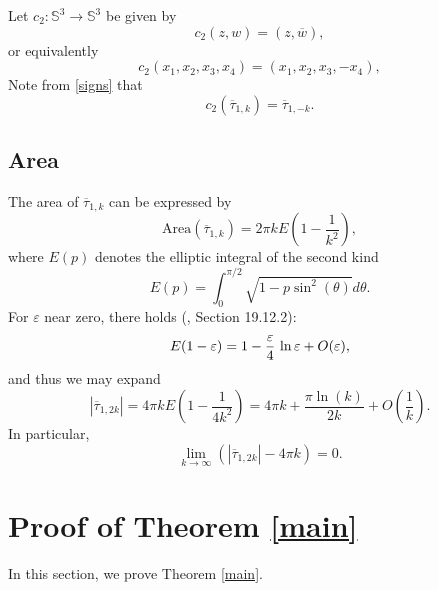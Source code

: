 \documentclass[11pt, reqno]{amsart}
\numberwithin{equation}{section}
\begin{document}
Let $c_2:\mathbb{S}^3\to\mathbb{S}^3$ be given by 
\begin{equation}
c_2(z,w) = (z,\overline{w}), 
\end{equation}
or equivalently
\begin{equation}
c_2(x_1,x_2,x_3,x_4)=(x_1,x_2,x_3,-x_4), 
\end{equation}
Note from \eqref{signs} that
\begin{equation}\label{secondconj}
c_2(\overline{\tau}_{1,k})=\overline{\tau}_{1,-k}.
\end{equation}
\subsection{Area}
The area of $\overline{\tau}_{1,k}$ can be expressed by
\begin{equation}
\mbox{Area}(\overline{\tau}_{1,k})=2\pi kE(1-\frac{1}{k^2}), 
\end{equation}
where $E(p)$ denotes the elliptic integral of the second kind 
\begin{equation}
E(p) =\int_0^{\pi/2}\sqrt{1-p\sin^2(\theta)}d\theta.
\end{equation}
For $\varepsilon$ near zero, there holds (\cite{DLMF}, Section 19.12.2):
\begin{equation}
E(1-\varepsilon)
=1-\frac{\varepsilon}{4}\,\ln\\\varepsilon
+
O(\varepsilon),
\end{equation}
and thus we may expand
\begin{equation}
|\overline{\tau}_{1,2k}|=4\pi k E(1-\frac{1}{4k^2})= 4\pi k +\frac{\pi\ln(k)}{2k}+O(\frac{1}{k}).
\end{equation}
In particular, 
\begin{equation}\label{limitarea}
\lim_{k\to\infty}(|\overline{\tau}_{1,2k}|-4\pi k)=0.
\end{equation}

\section{Proof of Theorem \ref{main}}\label{mainsection}
In this section, we prove Theorem \ref{main}.
\end{document}

